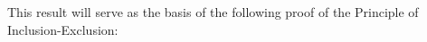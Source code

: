 \documentclass{article} %
\theoremstyle{definition}
\theoremstyle{plain}
\begin{document}

This result will serve as the basis of the following proof of the Principle of Inclusion-Exclusion:
\end{document}
